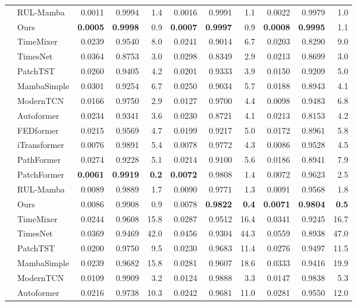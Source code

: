 \documentclass[final,5p,times,twocolumn]{elsarticle}
\begin{document}
\begin{table}[!t]
\begin{tabular}{@{}ll rrr rrr rrr@{}}
  & RUL-Mamba & 0.0011 &0.9994&1.4& 0.0016 &0.9991&1.1& 0.0022 &0.9979&1.0 \\
  & Ours &\textbf{0.0005}&\textbf{0.9998}&0.9&\textbf{0.0007}&\textbf{0.9997}&0.9&\textbf{0.0008}&\textbf{0.9995}&1.1 \\
\midrule
{} & TimeMixer & 0.0239 &0.9540&8.0& 0.0241 &0.9014&6.7& 0.0203 &0.8290&9.0 \\
  & TimesNet & 0.0364 &0.8753&3.0& 0.0298 &0.8349&2.9& 0.0213 &0.8699&3.0 \\
  & PatchTST & 0.0260 &0.9405&4.2& 0.0201 &0.9333&3.9& 0.0150 &0.9209&5.0 \\
  & MambaSimple & 0.0301 &0.9254&6.7& 0.0250 &0.9034&5.7& 0.0188 &0.8943&4.1 \\
  & ModernTCN & 0.0166 &0.9750&2.9& 0.0127 &0.9700&4.4& 0.0098 &0.9483&6.8 \\
  & Autoformer & 0.0234 &0.9341&3.6& 0.0230 &0.8721&4.1& 0.0213 &0.8153&4.2 \\
  & FEDformer & 0.0215 &0.9569&4.7& 0.0199 &0.9217&5.0& 0.0172 &0.8961&5.8 \\
  & iTransformer & 0.0076 &0.9891&5.4& 0.0078 &0.9772&4.3& 0.0086 &0.9528&4.5 \\
  & PathFormer & 0.0274 &0.9228&5.1& 0.0214 &0.9100&5.6& 0.0186 &0.8941&7.9 \\
  & PatchFormer & \textbf{0.0061} &\textbf{0.9919}&\textbf{0.2}& \textbf{0.0072} &0.9808&1.4& 0.0072 &0.9623&2.5 \\
  & RUL-Mamba & 0.0089 &0.9889&1.7& 0.0090 &0.9771&1.3& 0.0091 &0.9568&1.8 \\
  & Ours &0.0086&0.9908&0.9&0.0078&\textbf{0.9822}&\textbf{0.4}&\textbf{0.0071}&\textbf{0.9804}&\textbf{0.5} \\
\midrule
{} & TimeMixer & 0.0244 &0.9608&15.8& 0.0287 &0.9512&16.4& 0.0341 &0.9245&16.7 \\
  & TimesNet & 0.0369 &0.9469&42.0& 0.0456 &0.9304&44.3& 0.0559 &0.8938&47.0 \\
  & PatchTST & 0.0200 &0.9750&9.5& 0.0230 &0.9683&11.4& 0.0276 &0.9497&11.5 \\
  & MambaSimple & 0.0239 &0.9682&15.8& 0.0281 &0.9607&18.6& 0.0333 &0.9416&19.9 \\
  & ModernTCN & 0.0109 &0.9909&3.2& 0.0124 &0.9888&3.3& 0.0147 &0.9838&5.3 \\
  & Autoformer & 0.0216 &0.9738&10.3& 0.0242 &0.9681&11.0& 0.0281 &0.9550&12.0 \\

\end{tabular}
\end{table}
\end{document}
